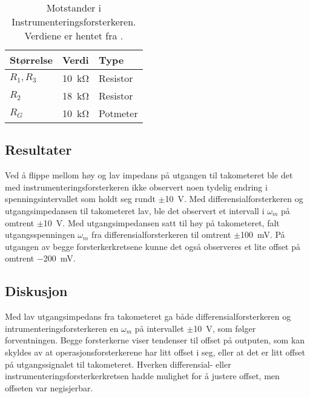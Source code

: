 \begin{table}[h]
	\centering
    \caption{Motstander i Instrumenteringsforsterkeren. Verdiene er hentet fra \cite{AnalogMotorlabbOppgaver}.}
	\begin{tabular}{lll}
		\toprule
		Størrelse & Verdi & Type \\
		\midrule
        $R_1, R_3$ & \SI{10}{\kilo\ohm} & Resistor \\
        $R_2$ & \SI{18}{\kilo\ohm} & Resistor\\
        $R_G$ & \SI{10}{\kilo\ohm} & Potmeter\\
		\bottomrule
	\end{tabular}
    \label{tab:Instrumenteringsforsterker}
\end{table}







\subsection{Resultater}

Ved å flippe mellom høy og lav impedans på utgangen til takometeret ble det med instrumenteringsforsterkeren ikke observert noen tydelig endring i spenningsintervallet som holdt seg rundt $\pm${\SI{10}{\volt}}. 
Med differensialforsterkeren og utgangsimpedansen til takometeret lav, ble det observert et intervall i $\omega_m$ på omtrent $\pm${\SI{10}{\volt}}. Med utgangsimpedansen satt til høy på takometeret, falt utgangsspenningen $\omega_m$ fra differensialforsterkeren til omtrent $\pm${\SI{100}{\milli\volt}}.
På utgangen av begge forsterkerkretsene kunne det også observeres et lite offset på omtrent $-${\SI{200}{\milli\volt}}.






\subsection{Diskusjon}

Med lav utgangsimpedans fra takometeret ga både differensialforsterkeren og intrumenteringsforsterkeren en $\omega_m$ på intervallet $\pm${\SI{10}{\volt}}, som følger forventningen.
Begge forsterkerne viser tendenser til offset på outputen, som kan skyldes av at operasjonsforsterkerene har litt offset i seg, eller at det er litt offset på utgangssignalet til takometeret. 
Hverken differensial- eller instrumenteringsforsterkerkretsen hadde mulighet for å justere offset, men offseten var negisjerbar.

